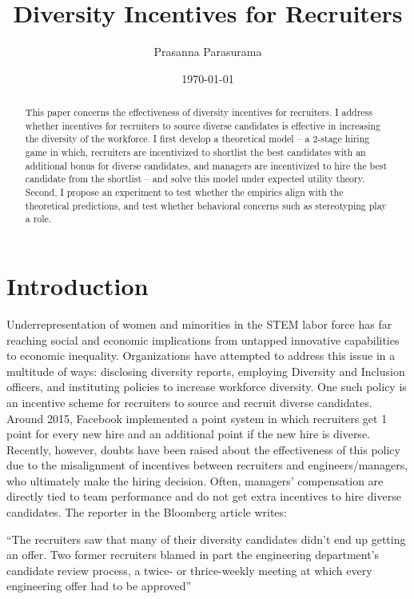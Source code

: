 \documentclass[11pt]{article}
\begin{document}
\title{Diversity Incentives for Recruiters}
\author{Prasanna Parasurama}
\date{\today}
\maketitle

\begin{abstract}
    This paper concerns the effectiveness of diversity incentives for recruiters. I address whether incentives for recruiters to source diverse candidates is effective in increasing the diversity of the workforce. I first develop a theoretical model --  a 2-stage hiring game in which, recruiters are incentivized to shortlist the best candidates with an additional bonus for diverse candidates, and managers are incentivized to hire the best candidate from the shortlist -- and solve this model under expected utility theory. Second, I propose an experiment to test whether the empirics align with the theoretical predictions, and test whether behavioral concerns such as stereotyping play a role.
\end{abstract}

\section{Introduction}
Underrepresentation of women and minorities in the STEM labor force has far reaching social and economic implications from untapped innovative capabilities to economic inequality.
Organizations have attempted to address this issue in a multitude of ways: disclosing diversity reports, employing Diversity and Inclusion officers, and instituting policies to increase workforce diversity. One such policy is an incentive scheme for recruiters to source and recruit diverse candidates. Around 2015, Facebook implemented a point system in which recruiters get 1 point for every new hire and an additional point if the new hire is diverse. Recently, however, doubts have been raised about the effectiveness of this policy due to the misalignment of incentives between recruiters and engineers/managers, who ultimately make the hiring decision. Often, managers' compensation are directly tied to team performance and do not get extra incentives to hire diverse candidates. The reporter in the Bloomberg article writes:

``The recruiters saw that many of their diversity candidates didn’t end up getting an offer. Two former recruiters blamed in part the engineering department’s candidate review process, a twice- or thrice-weekly meeting at which every engineering offer had to be approved''
\end{document}
